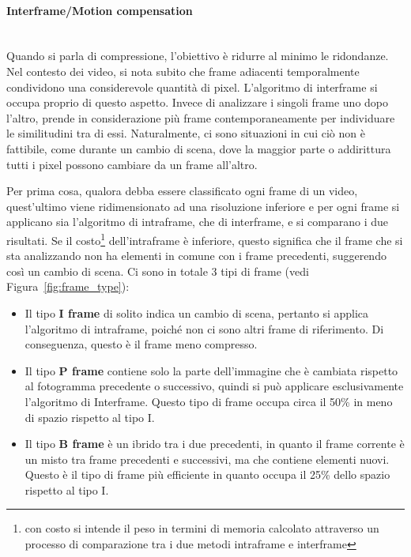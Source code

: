 \documentclass[a4paper,12pt, oneside]{article}
\begin{document}
\paragraph{Interframe/Motion compensation}\hphantom{A}\\
Quando si parla di compressione, l'obiettivo è ridurre al minimo le ridondanze. Nel contesto dei video,
si nota subito che frame adiacenti temporalmente condividono una considerevole quantità di pixel.
L'algoritmo di interframe si occupa proprio di questo aspetto. Invece di analizzare i singoli frame uno
dopo l'altro, prende in considerazione più frame contemporaneamente per individuare le similitudini tra
di essi. Naturalmente, ci sono situazioni in cui ciò non è fattibile, come durante un cambio di scena,
dove la maggior parte o addirittura tutti i pixel possono cambiare da un frame all'altro.

Per prima cosa, qualora debba essere classificato ogni frame di un video, quest'ultimo viene
ridimensionato ad una risoluzione inferiore e per ogni frame si applicano sia l'algoritmo di intraframe,
che di interframe, e si comparano i due risultati. Se il costo\footnote{con costo si intende il peso
in termini di memoria calcolato attraverso un processo di comparazione tra i due metodi intraframe e interframe}
dell'intraframe è inferiore, questo
significa che il frame che si sta analizzando non ha elementi in comune con i frame precedenti,
suggerendo così un cambio di scena. Ci sono in totale 3 tipi di frame (vedi Figura~\ref{fig:frame_type}):

\begin{itemize}
  \item Il tipo \textbf{I frame} di solito indica un cambio di scena, pertanto si applica l'algoritmo
  di intraframe, poiché non ci sono altri frame di riferimento. Di conseguenza, questo è il frame meno
  compresso. 
  \item Il tipo \textbf{P frame} contiene solo la parte dell'immagine che è cambiata rispetto al fotogramma
  precedente o successivo, quindi si può applicare esclusivamente l'algoritmo di Interframe. Questo tipo di
  frame occupa circa il 50\% in meno di spazio rispetto al tipo I.
  \item Il tipo \textbf{B frame} è un ibrido tra i due precedenti, in quanto il frame corrente è un misto
  tra frame precedenti e successivi, ma che contiene elementi nuovi. Questo è il tipo di frame più
  efficiente in quanto occupa il 25\% dello spazio rispetto al tipo I.
\end{itemize}
\end{document}
